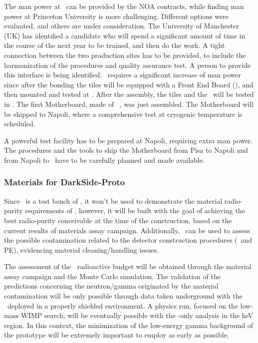 The man power at \LNGS\ can be provided by the NOA contracts, while finding man power at Princeton University is more challenging. Different options were evaluated, and others are under consideration. The University of Manchester (UK) has identified a candidate who will spend a significant amount of time in the course of the next year to be trained, and then do the work.  A tight connection between the two production sites has to be provided, to include the harmonization of the procedures and quality assurance test. A person to provide this interface is being identified.  \LNGS\ requires a significant increase of man power since after the bonding the tiles will be equipped with a Front End Board (\FEB), and then mounted and tested at \LNGS. After the assembly, the tiles and the \FEB\ will be tested in \LIN.  The first Motherboard, made of \DSkSQBPdmsNumber\ \DSkPdms, was just assembled.  The Motherboard will be shipped to Napoli, where a comprehensive test at cryogenic temperature is scheduled.

A powerful test facility has to be prepared at Napoli, requiring extra man power. The procedures and the tools to ship the Motherboard from Pisa to Napoli and from Napoli to \CERN\ have to be carefully planned and made available. 


\subsubsection{Materials for DarkSide-Proto}

Since \DSps\ is a test bench of \DSks, it won't be used to demonstrate the material radio-purity requirements of \DSks, however, it will be built with the goal of achieving the best radio-purity conceivable at the time of the construction, based on the current results of materials assay campaign. Additionally, \DSps\ can be used to assess the possible contamination related to the detector construction procedures (\TPC\ and PE), evidencing material cleaning/handling issues.

The assessment of the \DSps\ radioactive budget will be obtained through the material assay campaign and the Monte Carlo simulation. The validation of the predictions concerning the neutron/gamma originated by the material contamination will be only possible through data taken underground with the \DSps\ deployed in a properly shielded environment. A physics run, focused on the low-mass WIMP search, will be eventually possible with the \STwo-only analysis in the keV region. In this context, the minimization of the low-energy gamma background of the prototype will be extremely important to employ as early as possible.

